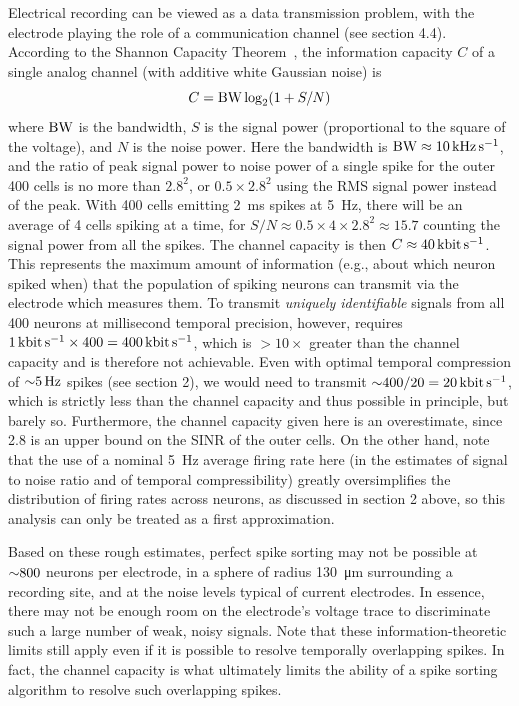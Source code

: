Electrical recording can be viewed as a data transmission problem, with the electrode playing the role of a communication channel (see section 4.4). According to the  Shannon Capacity Theorem~\cite{cover06}, the information capacity $C$ of a single analog channel (with additive white Gaussian noise)  is \[C = \text{BW} \log_2 (1 + S/N)\] where $\text{BW}$ is the bandwidth, $S$ is the signal power (proportional to the square of the voltage), and $N$ is the noise power.  Here the bandwidth is $\text{BW} \approx \SI{10}{\kilo\hertz\per\second}$, and the ratio of peak signal power to noise power of a single spike for the outer 400 cells is no more than $\num{2.8}^{\num{2}}$, or $\num{0.5}\times\num{2.8}^{\num{2}}$ using the RMS signal power instead of the peak.  With \num{400} cells emitting \SI{2}{\milli\second} spikes at \SI{5}{\hertz}, there will be an average of \num{4} cells spiking at a time, for  $S/N \approx 0.5 \times 4\times \num{2.8}^{\num{2}} \approx \num{15.7}$ counting the signal power from all the spikes. The channel capacity is then $C \approx \SI{40}{\kilo\bit\per\second}$. This represents the maximum amount of information (e.g., about which neuron spiked when) that the population of spiking neurons can transmit via the electrode which measures them. To transmit \emph{uniquely identifiable} signals from all \num{400} neurons at millisecond temporal precision, however, requires $\SI{1}{\kilo\bit\per\second} \times 400 = \SI{400}{\kilo\bit\per\second}$, which is $>\num{10}\times$ greater than the channel capacity and is therefore not achievable.  Even with optimal temporal compression of ${\sim} \SI{5}{\hertz}$ spikes (see section 2), we would need to transmit $\ca 400/20 = \SI{20}{\kilo\bit\per\second}$, which is strictly less than the channel capacity and thus possible in principle, but barely so.  Furthermore, the channel capacity given here is an overestimate, since 2.8 is an upper bound on the SINR of the outer cells. On the other hand, note that the use of a nominal \SI{5}{\hertz} average firing rate here (in the estimates of signal to noise ratio and of temporal compressibility) greatly oversimplifies the distribution of firing rates across neurons, as discussed in section 2 above, so this analysis can only be treated as a first approximation.

Based on these rough estimates, perfect spike sorting may not be possible at ${\sim} \num{800}$ neurons per electrode, in a sphere of radius \SI{130}{\micro\meter} surrounding a recording site, and at the noise levels typical of current electrodes. In essence, there may not be enough room on the electrode’s voltage trace to discriminate such a large number of weak, noisy signals. Note that these information-theoretic limits still apply even if it is possible to resolve temporally overlapping spikes. In fact, the channel capacity is what ultimately limits the ability of a spike sorting algorithm to resolve such overlapping spikes.

